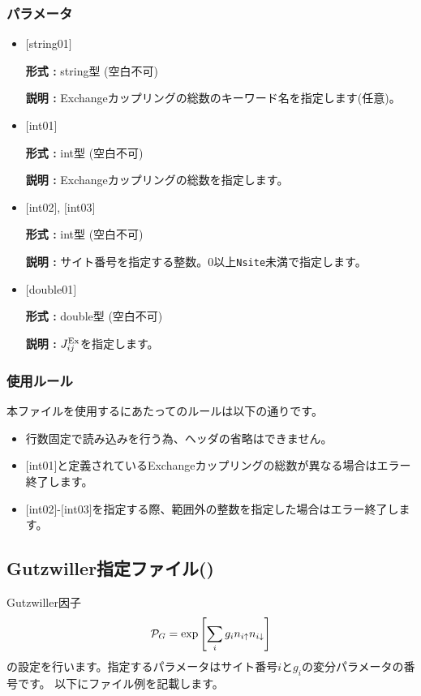 \subsubsection{パラメータ}
 \begin{itemize}

   \item  $[$string01$]$
   
    {\bf 形式 :} string型 (空白不可)

   {\bf 説明 :} Exchangeカップリングの総数のキーワード名を指定します(任意)。

   \item  $[$int01$]$
   
    {\bf 形式 :} int型 (空白不可)

   {\bf 説明 :} Exchangeカップリングの総数を指定します。

  \item  $[$int02$]$, $[$int03$]$
  
 {\bf 形式 :} int型 (空白不可)

{\bf 説明 :} サイト番号を指定する整数。0以上\verb|Nsite|{未満}で指定します。
 
 \item  $[$double01$]$
   
   {\bf 形式 :} double型 (空白不可)

  {\bf 説明 :}  $J_{ij}^{\rm Ex}$を指定します。
  
\end{itemize}

\subsubsection{使用ルール}
本ファイルを使用するにあたってのルールは以下の通りです。
\begin{itemize}
\item 行数固定で読み込みを行う為、ヘッダの省略はできません。
\item $[$int01$]$と定義されているExchangeカップリングの総数が異なる場合はエラー終了します。
\item $[$int02$]$-$[$int03$]$を指定する際、範囲外の整数を指定した場合はエラー終了します。
\end{itemize}

\newpage
\subsection{Gutzwiller指定ファイル()}
\label{Subsec:Gutzwiller}

Gutzwiller因子
\begin{equation}
{\cal P}_G=\exp\left[ \sum_i g_i n_{i\uparrow} n_{i\downarrow} \right]
\end{equation}
の設定を行います。指定するパラメータはサイト番号$i$と$g_i$の変分パラメータの番号です。
以下にファイル例を記載します。

